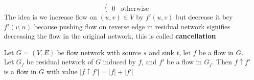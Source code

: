 \documentclass[11pt]{article}
\begin{document}
\begin{defn*}
\begin{enumerate}
\[\begin{cases}
                0 & \text{otherwise}
            \end{cases}
        \]
        The idea is we increase flow on $(u,v) \in V$ by $f'(u,v)$ but decrease it bey $f'(v,u)$ because pushing flow on reverse edge in residual network signifies decreasing the flow in the original network, this is called \textbf{cancellation}
        \begin{lemma*}
            Let $G=(V,E)$ be flow network with source $s$ and sink $t$, let $f$ be a flow in $G$. Let $G_f$ be residual network of $G$ induced by $f$, and $f'$ be a flow in $G_f$. Then $f \uparrow f'$ is a flow in $G$ with value $|f \uparrow f'| = |f| + |f'|$
        \end{lemma*}
    \end{enumerate}
\end{defn*}
\end{document}

